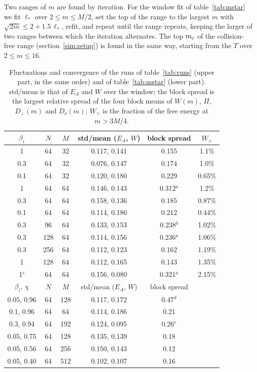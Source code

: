 Two ranges of $m$ are found by iteration. For the window fit of table~\ref{tab:mstar} we fit $\ell_*$ over $2\le m\le M/2$, set the top of the range to the largest $m$ with $\sqrt{2m}\le2+1.5\,\ell_*$, refit, and repeat until the range repeats, keeping the larger of two ranges between which the iteration alternates. The top $m_{\rm c}$ of the collision-free range (section~\ref{sim:setup}) is found in the same way, starting from the $T$ over $2\le m\le16$.

\begin{table}[t]
  \centering
  \caption{Fluctuations and convergence of the runs of table~\ref{tab:runs} (upper part, in the same order) and of table~\ref{tab:mstar} (lower part). std/mean is that of $E_A$ and $W$ over the window; the block spread is the largest relative spread of the four block means of $W(m)$, $\Pi$, $D_\perp(m)$ and $D_\nu(m)$; $W_{>}$ is the fraction of the free energy at $m>3M/4$.}
  \label{tab:checks}
  \begin{tabular}{cccccc}
    \toprule
    $\beta_i$ & $N$ & $M$ & std/mean ($E_A$, $W$) & block spread & $W_{>}$ \\
    \midrule
    1 & 64 & 32 & 0.117, 0.141 & 0.155 & 1.1\% \\
    0.3 & 64 & 32 & 0.076, 0.147 & 0.174 & 1.0\% \\
    0.1 & 64 & 32 & 0.120, 0.180 & 0.229 & 0.65\% \\
    1 & 64 & 64 & 0.146, 0.143 & 0.312$^a$ & 1.2\% \\
    0.3 & 64 & 64 & 0.158, 0.136 & 0.185 & 0.87\% \\
    0.1 & 64 & 64 & 0.114, 0.186 & 0.212 & 0.44\% \\
    0.3 & 96 & 64 & 0.133, 0.153 & 0.238$^b$ & 1.02\% \\
    0.3 & 128 & 64 & 0.114, 0.156 & 0.236$^a$ & 1.06\% \\
    0.3 & 256 & 64 & 0.112, 0.123 & 0.162 & 1.19\% \\
    1 & 128 & 64 & 0.112, 0.165 & 0.143 & 1.35\% \\
    1$^c$ & 64 & 64 & 0.156, 0.080 & 0.321$^a$ & 2.15\% \\
    \midrule
    $\beta_i$, $\chi$ & $N$ & $M$ & std/mean ($E_A$, $W$) & block spread & \\
    \midrule
    0.05, 0.96 & 64 & 128 & 0.117, 0.172 & 0.47$^d$ & \\
    0.1, 0.96 & 64 & 64 & 0.114, 0.186 & 0.21 & \\
    0.3, 0.94 & 64 & 192 & 0.124, 0.095 & 0.26$^e$ & \\
    0.05, 0.75 & 64 & 128 & 0.135, 0.139 & 0.18 & \\
    0.05, 0.56 & 64 & 256 & 0.150, 0.143 & 0.12 & \\
    0.05, 0.40 & 64 & 512 & 0.102, 0.107 & 0.16 & \\
    \bottomrule
  \end{tabular}


\end{table}
